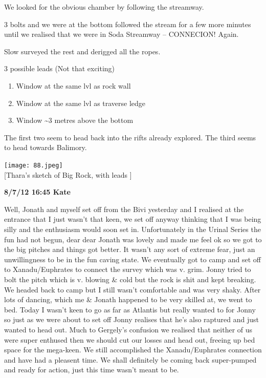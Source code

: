 We looked for the obvious chamber by following the streamway.

3 bolts and we were at the bottom followed the stream for a few more
minutes until we realised that we were in Soda Streamway -- CONNECION!
Again.

Slow surveyed the rest and derigged all the ropes.

3 possible leads (Not that exciting)

\begin{enumerate}
\def\labelenumi{\arabic{enumi}.}
\tightlist
\item
  Window at the same lvl as rock wall
\item
  Window at the same lvl as traverse ledge
\item
  Window \textasciitilde{}3 metres above the bottom
\end{enumerate}

The first two seem to head back into the rifts already explored. The
third seems to head towards Balimory.

\texttt{[image: 88.jpeg]}\\
{[}Thara's sketch of Big Rock, with leads {]}

\textbf{8/7/12 16:45 Kate}

Well, Jonath and myself set off from the Bivi yesterday and I realised
at the entrance that I just wasn't that keen, we set off anyway thinking
that I was being silly and the enthusiasm would soon set in.
Unfortunately in the Urinal Series the fun had not begun, dear dear
Jonath was lovely and made me feel ok so we got to the big pitches and
things got better. It wasn't any sort of extreme fear, just an
unwillingness to be in the fun caving state. We eventually got to camp
and set off to Xanadu/Euphrates to connect the survey which was v. grim.
Jonny tried to bolt the pitch which is v. blowing \& cold but the rock
is shit and kept breaking. We headed back to camp but I still wasn't
comfortable and was very shaky. After lots of dancing, which me \&
Jonath happened to be very skilled at, we went to bed. Today I wasn't
keen to go as far as Atlantis but really wanted to for Jonny so just as
we were about to set off Jonny realises that he's also raptured and just
wanted to head out. Much to Gergely's confusion we realised that neither
of us were super enthused then we should cut our losses and head out,
freeing up bed space for the mega-keen. We still accomplished the
Xanadu/Euphrates connection and have had a pleasent time. We shall
definitely be coming back super-pumped and ready for action, just this
time wasn't meant to be.

